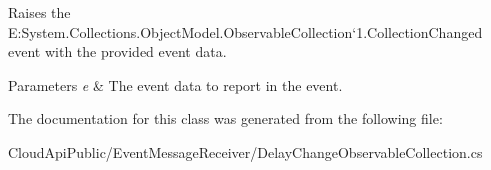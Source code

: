Raises the E\-:\-System.\-Collections.\-Object\-Model.\-Observable\-Collection`1.\-Collection\-Changed event with the provided event data. 


\begin{DoxyParams}{Parameters}
{\em e} & The event data to report in the event.\\
\hline
\end{DoxyParams}


The documentation for this class was generated from the following file\-:\begin{DoxyCompactItemize}
\item 
Cloud\-Api\-Public/\-Event\-Message\-Receiver/Delay\-Change\-Observable\-Collection.\-cs\end{DoxyCompactItemize}
